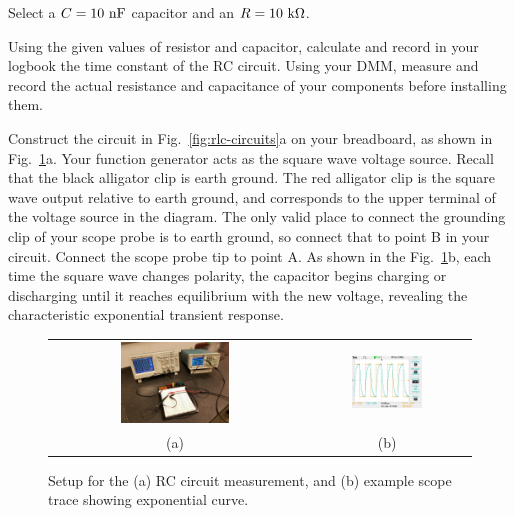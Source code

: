 Select a $C=10~\rm nF$ capacitor and an $R=10~\rm k\Omega$.

\begin{measurement}
Using the given values of resistor and capacitor, calculate and record
in your logbook the time constant of the RC circuit.  Using your DMM,
measure and record the actual resistance and capacitance of your
components before installing them.
\end{measurement}

Construct the circuit in Fig.~\ref{fig:rlc-circuits}a on your
breadboard, as shown in Fig.~\ref{fig:rc_setup}a.  Your function
generator acts as the square wave voltage source.  Recall that the
black alligator clip is earth ground.  The red alligator clip is the
square wave output relative to earth ground, and corresponds to the
upper terminal of the voltage source in the diagram.  The only valid
place to connect the grounding clip of your scope probe is to earth
ground, so connect that to point B in your circuit.  Connect the scope
probe tip to point A.  As shown in the Fig.~\ref{fig:rc_setup}b, each
time the square wave changes polarity, the capacitor begins charging
or discharging until it reaches equilibrium with the new voltage,
revealing the characteristic exponential transient response.

\begin{figure}[htbp]
\begin{center}
\begin{tabular}{cc}
\includegraphics[width=0.45\textwidth]{figs/labs/transients/rc_setup.jpg} &
\includegraphics[width=0.45\textwidth]{figs/labs/transients/rc_trace.jpg} \\
(a) & (b) \\
\end{tabular}
\caption{Setup for the (a) RC circuit measurement, and (b) example scope trace showing exponential curve.}
\label{fig:rc_setup}
\end{center}
\end{figure}

